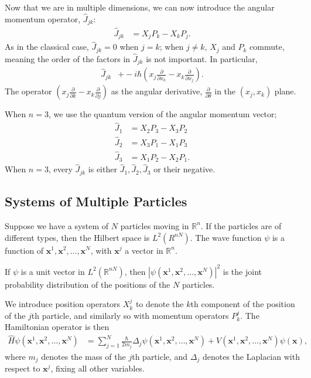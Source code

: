 \documentclass[10pt]{extarticle}
\newcommand{\R}{\mathbb{R}}
\theoremstyle{plain}
\theoremstyle{definition}
\theoremstyle{remark}
\renewcommand{\newline}{\hfill\break}
\begin{document}
  Now that we are in multiple dimensions, we can now introduce the angular momentum operator, $\hat{J}_{jk}$:
  \begin{align*}
    \hat{J}_{jk} &= X_jP_k - X_kP_j.
  \end{align*}
  As in the classical case, $\hat{J}_{jk} = 0$ when $j=k$; when $j\neq k$, $X_j$ and $P_k$ commute, meaning the order of the factors in $\hat{J}_{jk}$ is not important. In particular,
  \begin{align*}
    \hat{J}_{jk} &+ -i\hbar \left(x_j\frac{\partial}{\partial x_k} - x_k\frac{\partial}{\partial x_j}\right).
  \end{align*}
  The operator $\displaystyle \left(x_j\frac{\partial}{\partial k} - x_k\frac{\partial}{\partial j}\right)$ as the angular derivative, $\frac{\partial}{\partial \theta}$ in the $(x_j,x_k)$ plane.\newline

  When $n=3$, we use the quantum version of the angular momentum vector;
  \begin{align*}
    \hat{J}_1 &= X_2P_3 - X_3P_2\\
    \hat{J}_2 &= X_3P_1 - X_1P_3\\
    \hat{J}_3 &= X_1P_2 - X_2P_1.
  \end{align*}
  When $n=3$, every $\hat{J}_{jk}$ is either $\hat{J}_1,\hat{J}_2,\hat{J}_3$ or their negative.
  \subsection{Systems of Multiple Particles}%
  Suppose we have a system of $N$ particles moving in $\R^n$. If the particles are of different types, then the Hilbert space is $L^2(R^{nN})$. The wave function $\psi$ is a function of $\mathbf{x}^1,\mathbf{x}^2,\dots,\mathbf{x}^N$, with $\mathbf{x}^j$ a vector in $\R^n$.\newline

  If $\psi$ is a unit vector in $L^{2}(\R^{nN})$, then $|\psi(\mathbf{x}^1,\mathbf{x}^2,\dots,\mathbf{x}^N)|^2$ is the joint probability distribution of the positions of the $N$ particles.\newline

  We introduce position operators $X_{k}^{j}$ to denote the $k$th component of the position of the $j$th particle, and similarly so with momentum operators $P_{k}^{j}$. The Hamiltonian operator is then
  \begin{align*}
    \hat{H}\psi\left(\mathbf{x}^1,\mathbf{x}^2,\dots,\mathbf{x}^N\right) &= \sum_{j=1}^{N}\frac{\hbar}{2m_j}\Delta_{j}\psi(\mathbf{x}^1,\mathbf{x}^2,\dots,\mathbf{x}^N) + V(\mathbf{x}^1,\mathbf{x}^2,\dots,\mathbf{x}^N)\psi(\mathbf{x}),
  \end{align*}
  where $m_j$ denotes the mass of the $j$th particle, and $\Delta_{j}$ denotes the Laplacian with respect to $\mathbf{x}^j$, fixing all other variables.\newline
\end{document}
